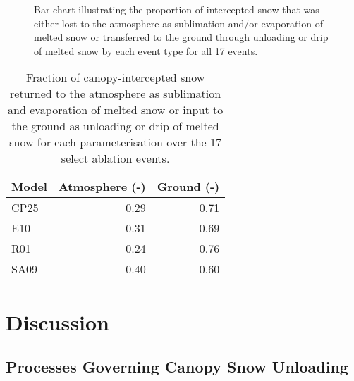 \documentclass[
]{agujournal2019}
\begin{document}
\begin{figure}[htbp]


\caption{\label{fig-partitioning}Bar chart illustrating the proportion
of intercepted snow that was either lost to the atmosphere as
sublimation and/or evaporation of melted snow or transferred to the
ground through unloading or drip of melted snow by each event type for
all 17 events.}

\end{figure}%

\begin{longtable}[]{@{}lrr@{}}

\caption{\label{tbl-frac-atm-ground}Fraction of canopy-intercepted snow
returned to the atmosphere as sublimation and evaporation of melted snow
or input to the ground as unloading or drip of melted snow for each
parameterisation over the 17 select ablation events.}

\tabularnewline

\toprule\noalign{}
Model & Atmosphere (-) & Ground (-) \\
\midrule\noalign{}
\endhead
\bottomrule\noalign{}
\endlastfoot
CP25 & 0.29 & 0.71 \\
E10 & 0.31 & 0.69 \\
R01 & 0.24 & 0.76 \\
SA09 & 0.40 & 0.60 \\

\end{longtable}

\section{Discussion}\label{discussion}

\subsection{Processes Governing Canopy Snow
Unloading}\label{processes-governing-canopy-snow-unloading}
\end{document}
